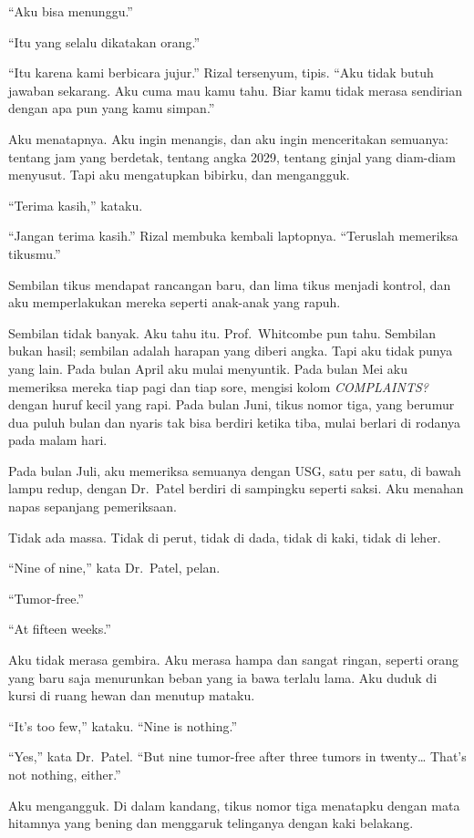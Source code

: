 \documentclass[11pt,twoside,openany]{book}
\makeatletter
\newcommand{\scenebreak}{\par\vspace{0.9em}{\centering\textsc{*\hspace{0.7em}*\hspace{0.7em}*}\par}\vspace{0.9em}\@afterindentfalse\@afterheading}
\makeatother
\begin{document}
``Aku bisa menunggu.''

``Itu yang selalu dikatakan orang.''

``Itu karena kami berbicara jujur.'' Rizal tersenyum, tipis. ``Aku tidak butuh jawaban sekarang. Aku cuma mau kamu tahu. Biar kamu tidak merasa sendirian dengan apa pun yang kamu simpan.''

Aku menatapnya. Aku ingin menangis, dan aku ingin menceritakan semuanya: tentang jam yang berdetak, tentang angka 2029, tentang ginjal yang diam-diam menyusut. Tapi aku mengatupkan bibirku, dan mengangguk.

``Terima kasih,'' kataku.

``Jangan terima kasih.'' Rizal membuka kembali laptopnya. ``Teruslah memeriksa tikusmu.''

\scenebreak
Sembilan tikus mendapat rancangan baru, dan lima tikus menjadi kontrol, dan aku memperlakukan mereka seperti anak-anak yang rapuh.

Sembilan tidak banyak. Aku tahu itu. Prof.~Whitcombe pun tahu. Sembilan bukan hasil; sembilan adalah harapan yang diberi angka. Tapi aku tidak punya yang lain. Pada bulan April aku mulai menyuntik. Pada bulan Mei aku memeriksa mereka tiap pagi dan tiap sore, mengisi kolom \emph{COMPLAINTS?} dengan huruf kecil yang rapi. Pada bulan Juni, tikus nomor tiga, yang berumur dua puluh bulan dan nyaris tak bisa berdiri ketika tiba, mulai berlari di rodanya pada malam hari.

Pada bulan Juli, aku memeriksa semuanya dengan USG, satu per satu, di bawah lampu redup, dengan Dr.~Patel berdiri di sampingku seperti saksi. Aku menahan napas sepanjang pemeriksaan.

Tidak ada massa. Tidak di perut, tidak di dada, tidak di kaki, tidak di leher.

``Nine of nine,'' kata Dr.~Patel, pelan.

``Tumor-free.''

``At fifteen weeks.''

Aku tidak merasa gembira. Aku merasa hampa dan sangat ringan, seperti orang yang baru saja menurunkan beban yang ia bawa terlalu lama. Aku duduk di kursi di ruang hewan dan menutup mataku.

``It's too few,'' kataku. ``Nine is nothing.''

``Yes,'' kata Dr.~Patel. ``But nine tumor-free after three tumors in twenty\ldots{} That's not nothing, either.''

Aku mengangguk. Di dalam kandang, tikus nomor tiga menatapku dengan mata hitamnya yang bening dan menggaruk telinganya dengan kaki belakang.
\end{document}
